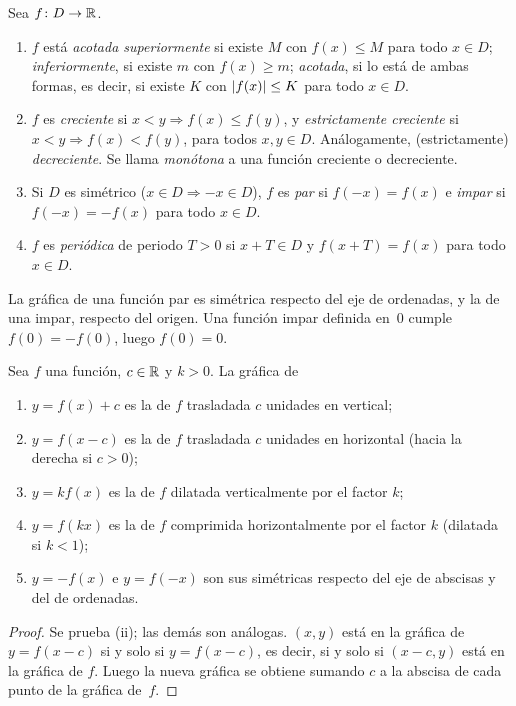 \begin{definicion}\label{def:propiedades}
Sea $f\colon D\to\mathbb{R}$.
\begin{enumerate}
  \item $f$ está \emph{acotada superiormente} si existe $M$ con $f(x)\le M$ para todo $x\in D$; \emph{inferiormente}, si existe $m$ con $f(x)\ge m$; \emph{acotada}, si lo está de ambas formas, es decir, si existe $K$ con $\lvert f(x)\rvert\le K$ para todo $x\in D$.
  \item $f$ es \emph{creciente} si $x<y\Rightarrow f(x)\le f(y)$, y \emph{estrictamente creciente} si $x<y\Rightarrow f(x)<f(y)$, para todos $x,y\in D$. Análogamente, (estrictamente) \emph{decreciente}. Se llama \emph{monótona} a una función creciente o decreciente.
  \item Si $D$ es simétrico ($x\in D\Rightarrow -x\in D$), $f$ es \emph{par} si $f(-x)=f(x)$ e \emph{impar} si $f(-x)=-f(x)$ para todo $x\in D$.
  \item $f$ es \emph{periódica} de periodo $T>0$ si $x+T\in D$ y $f(x+T)=f(x)$ para todo $x\in D$.
\end{enumerate}
\end{definicion}

La gráfica de una función par es simétrica respecto del eje de ordenadas, y la de una impar, respecto del origen. Una función impar definida en~$0$ cumple $f(0)=-f(0)$, luego $f(0)=0$.

\begin{proposicion}\label{prop:transformaciones}
Sea $f$ una función, $c\in\mathbb{R}$ y $k>0$. La gráfica de
\begin{enumerate}
  \item $y=f(x)+c$ es la de $f$ trasladada $c$ unidades en vertical;
  \item $y=f(x-c)$ es la de $f$ trasladada $c$ unidades en horizontal (hacia la derecha si $c>0$);
  \item $y=kf(x)$ es la de $f$ dilatada verticalmente por el factor $k$;
  \item $y=f(kx)$ es la de $f$ comprimida horizontalmente por el factor $k$ (dilatada si $k<1$);
  \item $y=-f(x)$ e $y=f(-x)$ son sus simétricas respecto del eje de abscisas y del de ordenadas.
\end{enumerate}
\end{proposicion}

\begin{proof}
Se prueba (ii); las demás son análogas. $(x,y)$ está en la gráfica de $y=f(x-c)$ si y solo si $y=f(x-c)$, es decir, si y solo si $(x-c,y)$ está en la gráfica de $f$. Luego la nueva gráfica se obtiene sumando $c$ a la abscisa de cada punto de la gráfica de~$f$.
\end{proof}

